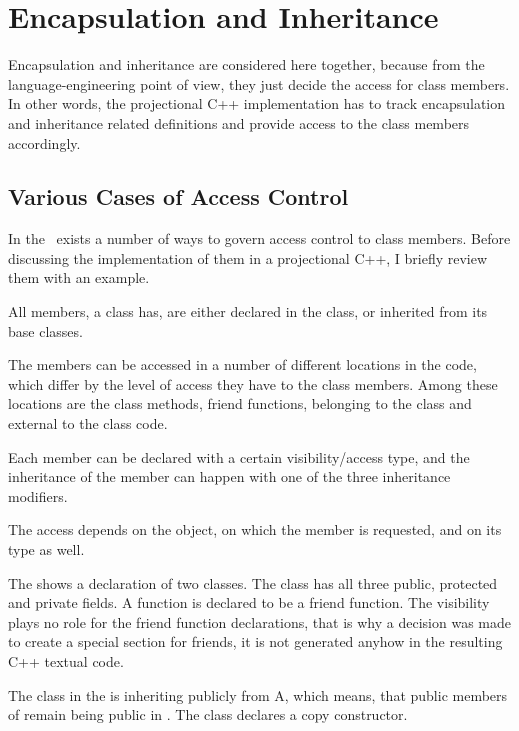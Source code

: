 \section{Encapsulation and Inheritance}


Encapsulation and inheritance are considered here together, because from the language-engineering point of view, 
they just decide the access for class members. In other words, the projectional C++ implementation has to track
encapsulation and inheritance related definitions and provide access to the class members accordingly.


\subsection{Various Cases of Access Control}

In the \cpppl\ exists a number of ways to govern access control to class members. Before discussing 
the implementation of them in a projectional C++, I briefly review them with an example.

All members, a class has, are either declared in the class, or inherited from its base classes. 

The members can be accessed in a number of different locations in the code, which differ by the level of access they have
to the class members. Among these locations are the class methods, friend functions, belonging to the class and
external to the class code. 

Each member can be declared with a certain visibility/access type, and the inheritance
of the member can happen with one of the three inheritance modifiers. 

The access depends on the object, on which the member is requested, and on its type as well.


The  shows a declaration of two classes. The class  has all three
public, protected and private fields. A function  is declared to be a
friend function. The visibility plays no role for the friend function declarations, 
that is why a decision was made to create a special section for friends, it is not 
generated anyhow in the resulting C++ textual code.

The class  in the  is inheriting publicly from A, which means,
that public members of  remain being public in . The class  declares
a copy constructor.

